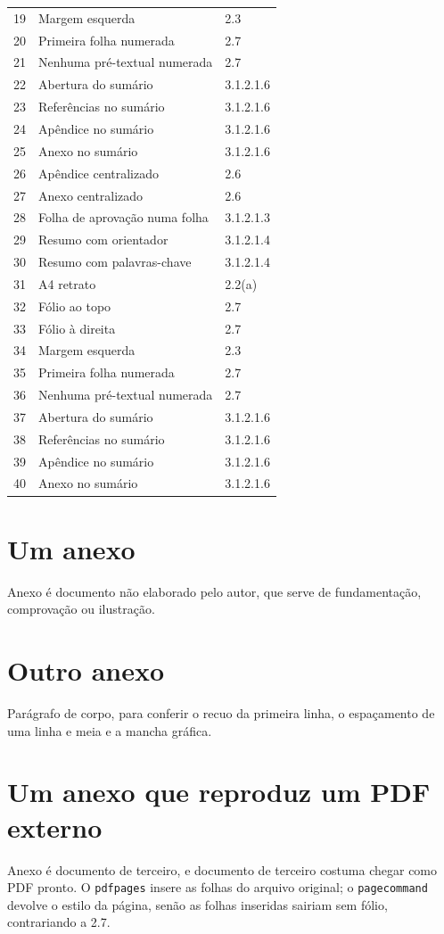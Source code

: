 \documentclass[dsc,pdfa,coorientador,dadoscoleta]{ufrj}
\begin{document}
\begin{longtable}{rll}
    19 & Margem esquerda & 2.3\\
    20 & Primeira folha numerada & 2.7\\
    21 & Nenhuma pré-textual numerada & 2.7\\
    22 & Abertura do sumário & 3.1.2.1.6\\
    23 & Referências no sumário & 3.1.2.1.6\\
    24 & Apêndice no sumário & 3.1.2.1.6\\
    25 & Anexo no sumário & 3.1.2.1.6\\
    26 & Apêndice centralizado & 2.6\\
    27 & Anexo centralizado & 2.6\\
    28 & Folha de aprovação numa folha & 3.1.2.1.3\\
    29 & Resumo com orientador & 3.1.2.1.4\\
    30 & Resumo com palavras-chave & 3.1.2.1.4\\
    31 & A4 retrato & 2.2(a)\\
    32 & Fólio ao topo & 2.7\\
    33 & Fólio à direita & 2.7\\
    34 & Margem esquerda & 2.3\\
    35 & Primeira folha numerada & 2.7\\
    36 & Nenhuma pré-textual numerada & 2.7\\
    37 & Abertura do sumário & 3.1.2.1.6\\
    38 & Referências no sumário & 3.1.2.1.6\\
    39 & Apêndice no sumário & 3.1.2.1.6\\
    40 & Anexo no sumário & 3.1.2.1.6\\
  \end{longtable}

  \annex
  \chapter{Um anexo}
  Anexo é documento não elaborado pelo autor, que serve de fundamentação, comprovação ou ilustração.
  \chapter{Outro anexo}
  Parágrafo de corpo, para conferir o recuo da primeira linha, o espaçamento de uma linha e meia e a mancha gráfica.
  \chapter{Um anexo que reproduz um PDF externo}
  Anexo é documento de terceiro, e documento de terceiro costuma chegar
  como PDF pronto. O \texttt{pdfpages} insere as folhas do arquivo
  original; o \texttt{pagecommand} devolve o estilo da página, senão as
  folhas inseridas sairiam sem fólio, contrariando a 2.7.
  

  \printindex
  \ufrjfinalpage
\end{document}
